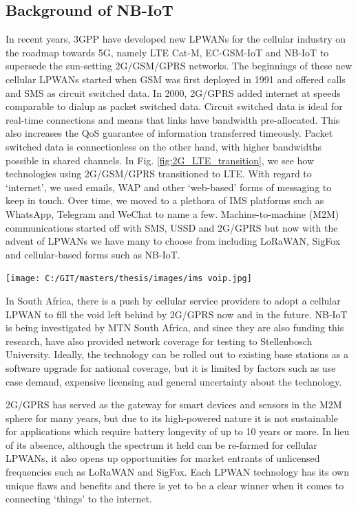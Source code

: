 \documentclass[]{article}
\let\origfigure\figure
\let\endorigfigure\endfigure
\renewenvironment{figure}[1][2] {
    \expandafter\origfigure\expandafter[H]
} {
    \endorigfigure
}
\begin{document}
\hypertarget{background}{%
\subsection{Background of NB-IoT}\label{background}}

In recent years, 3GPP have developed new LPWANs for the cellular
industry on the roadmap towards 5G, namely LTE Cat-M, EC-GSM-IoT and
NB-IoT to supersede the sun-setting 2G/GSM/GPRS networks. The beginnings
of these new cellular LPWANs started when GSM was first deployed in 1991
and offered calls and SMS as circuit switched data. In 2000, 2G/GPRS
added internet at speeds comparable to dialup as packet switched data.
Circuit switched data is ideal for real-time connections and means that
links have bandwidth pre-allocated. This also increases the QoS
guarantee of information transferred timeously. Packet switched data is
connectionless on the other hand, with higher bandwidths possible in
shared channels. In Fig. \ref{fig:2G_LTE_transition}, we see how
technologies using 2G/GSM/GPRS transitioned to LTE. With regard to
`internet', we used emails, WAP and other `web-based' forms of messaging
to keep in touch. Over time, we moved to a plethora of IMS platforms
such as WhatsApp, Telegram and WeChat to name a few. Machine-to-machine
(M2M) communications started off with SMS, USSD and 2G/GPRS but now with
the advent of LPWANs we have many to choose from including LoRaWAN,
SigFox and cellular-based forms such as NB-IoT.

\begin{figure}
\centering
\texttt{[image: C:/GIT/masters/thesis/images/ims voip.jpg]}
\caption{A simplified representation of the transition from 2G to LTE
with regard to technologies that keep people and `things' in
contact.\label{fig:2G_LTE_transition}}
\end{figure}

In South Africa, there is a push by cellular service providers to adopt
a cellular LPWAN to fill the void left behind by 2G/GPRS now and in the
future. NB-IoT is being investigated by MTN South Africa, and since they
are also funding this research, have also provided network coverage for
testing to Stellenbosch University. Ideally, the technology can be
rolled out to existing base stations as a software upgrade for national
coverage, but it is limited by factors such as use case demand,
expensive licensing and general uncertainty about the technology.

2G/GPRS has served as the gateway for smart devices and sensors in the
M2M sphere for many years, but due to its high-powered nature it is not
sustainable for applications which require battery longevity of up to 10
years or more. In lieu of its absence, although the spectrum it held can
be re-farmed for cellular LPWANs, it also opens up opportunities for
market entrants of unlicensed frequencies such as LoRaWAN and SigFox.
Each LPWAN technology has its own unique flaws and benefits and there is
yet to be a clear winner when it comes to connecting `things' to the
internet.
\end{document}
